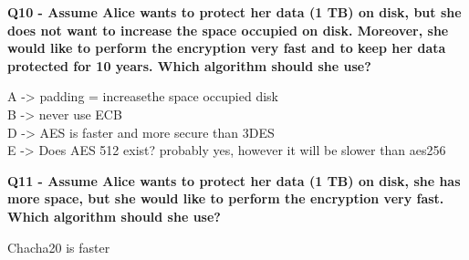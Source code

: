 \textbf{Q10 - Assume Alice wants to protect her data (1 TB) on disk, but she does not want to increase the space occupied on disk. Moreover, she would like to perform the encryption very fast and to keep her data protected for 10 years. Which algorithm should she use?}
\textcolor{Comment}{
    A -> padding = increasethe space occupied disk\\
    B -> never use ECB\\
    D -> AES is faster and more secure than 3DES\\
    E -> Does AES 512 exist? probably yes, however it will be slower than aes256 
}

\textbf{Q11 - Assume Alice wants to protect her data (1 TB) on disk, she has more space, but she would like to perform the encryption very fast. Which algorithm should she use?}
\textcolor{Comment}{Chacha20 is faster}

